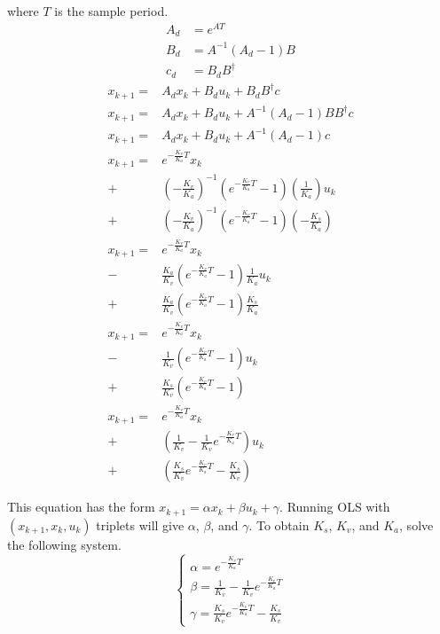 \documentclass[10pt,conference,compsoc]{IEEEtran}
\begin{document}
where $T$ is the sample period.
\begin{align*}
  A_d &= e^{AT} \\
  B_d &= A^{-1} (A_d - 1) B \\
  c_d &= B_d B^\dagger
\end{align*}
\begin{equation*}
  \begin{aligned}
    x_{k+1} =& A_d x_k + B_d u_k + B_d B^\dagger c \\
    x_{k+1} =& A_d x_k + B_d u_k + A^{-1} (A_d - 1) B B^\dagger c \\
    x_{k+1} =& A_d x_k + B_d u_k + A^{-1} (A_d - 1) c \\
    x_{k+1} =& e^{-\frac{K_v}{K_a} T} x_k \\
      +& \left(-\frac{K_v}{K_a}\right)^{-1}
        \left(e^{-\frac{K_v}{K_a} T} - 1\right)
        \left(\frac{1}{K_a}\right) u_k \\
      +& \left(-\frac{K_v}{K_a}\right)^{-1}
        \left(e^{-\frac{K_v}{K_a} T} - 1\right)
        \left(-\frac{K_s}{K_a}\right) \\
    x_{k+1} =& e^{-\frac{K_v}{K_a} T} x_k \\
      -& \frac{K_a}{K_v}
        \left(e^{-\frac{K_v}{K_a} T} - 1\right)
        \frac{1}{K_a} u_k \\
      +& \frac{K_a}{K_v}
        \left(e^{-\frac{K_v}{K_a} T} - 1\right)
        \frac{K_s}{K_a} \\
    x_{k+1} =& e^{-\frac{K_v}{K_a} T} x_k \\
      -& \frac{1}{K_v}
        \left(e^{-\frac{K_v}{K_a} T} - 1\right) u_k \\
      +& \frac{K_s}{K_v}
        \left(e^{-\frac{K_v}{K_a} T} - 1\right) \\
    x_{k+1} =& e^{-\frac{K_v}{K_a} T} x_k \\
      +& \left(\frac{1}{K_v} - \frac{1}{K_v}e^{-\frac{K_v}{K_a} T}\right) u_k \\
      +& \left(\frac{K_s}{K_v}e^{-\frac{K_v}{K_a} T} - \frac{K_s}{K_v}\right)
  \end{aligned}
\end{equation*}

This equation has the form $x_{k+1} = \alpha x_k + \beta u_k + \gamma$. Running
OLS with $(x_{k+1}, x_k, u_k)$ triplets will give $\alpha$, $\beta$, and
$\gamma$. To obtain $K_s$, $K_v$, and $K_a$, solve the following system.
\begin{equation*}
  \begin{cases}
    \alpha = e^{-\frac{K_v}{K_a} T} \\
    \beta = \frac{1}{K_v} - \frac{1}{K_v}e^{-\frac{K_v}{K_a} T} \\
    \gamma = \frac{K_s}{K_v}e^{-\frac{K_v}{K_a} T} - \frac{K_s}{K_v}
  \end{cases}
\end{equation*}
\end{document}
